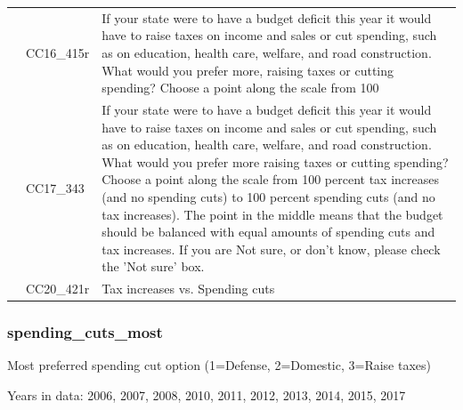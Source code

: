 \documentclass[
  12pt]{article}
\begin{document}
\begin{longtable}[t]{rl>{\raggedright\arraybackslash}p{10cm}}
\addlinespace
2016 & CC16\_415r & If your state were to have a budget deficit this year it would have to raise taxes on income and sales or cut spending, such as on education, health care, welfare, and road construction. What would you prefer more, raising taxes or cutting spending? Choose a point along the scale from 100\\
\addlinespace
2017 & CC17\_343 & If your state were to have a budget deficit this year it would have to raise taxes on income and sales or cut spending, such as on education, health care, welfare, and road construction. What would you prefer more raising taxes or cutting spending? Choose a point along the scale from 100 percent tax increases (and no spending cuts) to 100 percent spending cuts (and no tax increases). The point in the middle means that the budget should be balanced with equal amounts of spending cuts and tax increases. If you are Not sure, or don't know, please check the 'Not sure' box.\\
\addlinespace
2020 & CC20\_421r & Tax increases vs. Spending cuts\\*
\end{longtable}
\endgroup{}

\hypertarget{spending_cuts_most}{%
\subsubsection{spending\_cuts\_most}\label{spending_cuts_most}}

Most preferred spending cut option (1=Defense, 2=Domestic, 3=Raise
taxes)

Years in data: 2006, 2007, 2008, 2010, 2011, 2012, 2013, 2014, 2015,
2017\begingroup\fontsize{10}{12}\selectfont
\end{document}
